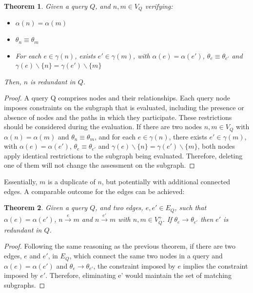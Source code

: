 \documentclass[mathematics,article,submit,pdftex,moreauthors]{Definitions/mdpi}
\newtheorem{theorem}{Theorem}
\begin{document}
\begin{theorem}{}
	Given a query $Q$, and $n,m\in V_Q$ verifying:
	\begin{itemize}
		\item $\alpha(n)=\alpha(m)$
		\item $\theta_n\equiv\theta_m$
		\item For each $e\in \gamma(n)$, exists $e'\in \gamma(m)$, with $\alpha(e)=\alpha(e')$, $\theta_e\equiv\theta_{e'}$ and $\gamma(e)\smallsetminus\{n\}=\gamma(e')\smallsetminus\{m\}$
	\end{itemize}
	Then, $n$ is redundant in $Q$.
\end{theorem}


\begin{proof}{}

A query Q comprises nodes and their relationships. Each query node imposes constraints on the subgraph that is evaluated, including the presence or absence of nodes and the paths in which they participate. These restrictions should be considered during the evaluation. If there are two nodes $n,m \in V_Q$ with $\alpha(n) = \alpha(m)$ and $\theta_n\equiv\theta_m$, and for each $e\in \gamma(n)$, there exists $e'\in \gamma(m)$, with $\alpha(e)=\alpha(e')$, $\theta_e\equiv\theta_{e'}$ and $\gamma(e)\smallsetminus\{n\}=\gamma(e')\smallsetminus\{m\}$, both nodes apply identical restrictions to the subgraph being evaluated. Therefore, deleting one of them will not change the assessment on the subgraph.
\end{proof}


Essentially, $m$ is a duplicate of $n$, but potentially with additional connected edges. A comparable outcome for the edges can be achieved:

\begin{theorem}{}
    Given a query $Q$, and two edges, $e, e'\in E_Q$, such that $\alpha(e)=\alpha(e')$, $n\stackrel {e}{\longrightarrow} m$ and $n\stackrel {e'}{\longrightarrow} m$ with $n,m \in V_Q^+$. If $\theta_e\rightarrow \theta_{e'}$ then $e'$ is redundant in $Q$.
\end{theorem}


\begin{proof}{}

Following the same reasoning as the previous theorem, if there are two edges, $e$ and $e'$, in $E_Q$, which connect the same two nodes in a query and $\alpha(e)=\alpha(e')$ and $\theta_e\rightarrow \theta_{e'}$, the constraint imposed by $e$ implies the constraint imposed by $e'$. Therefore, eliminating e' would maintain the set of matching subgraphs.

\end{proof}
\end{document}
